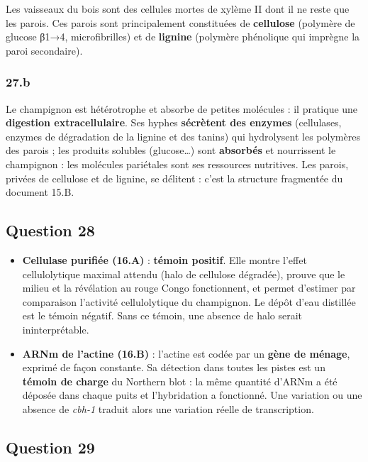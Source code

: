 \documentclass[11pt,a4paper]{article}
\providecommand{\tightlist}{\setlength{\itemsep}{0pt}\setlength{\parskip}{0pt}}
\begin{document}
Les vaisseaux du bois sont des cellules mortes de xylème II dont il ne reste que les parois. Ces parois sont principalement constituées de \textbf{cellulose} (polymère de glucose β1→4, microfibrilles) et de \textbf{lignine} (polymère phénolique qui imprègne la paroi secondaire).

\hypertarget{b}{%
\subsubsection{27.b}\label{b}}

Le champignon est hétérotrophe et absorbe de petites molécules : il pratique une \textbf{digestion extracellulaire}. Ses hyphes \textbf{sécrètent des enzymes} (cellulases, enzymes de dégradation de la lignine et des tanins) qui hydrolysent les polymères des parois ; les produits solubles (glucose\ldots) sont \textbf{absorbés} et nourrissent le champignon : les molécules pariétales sont ses ressources nutritives. Les parois, privées de cellulose et de lignine, se délitent : c'est la structure fragmentée du document 15.B.

\hypertarget{question-28}{%
\subsection{Question 28}\label{question-28}}

\begin{itemize}
\tightlist
\item
  \textbf{Cellulase purifiée (16.A)} : \textbf{témoin positif}. Elle montre l'effet cellulolytique maximal attendu (halo de cellulose dégradée), prouve que le milieu et la révélation au rouge Congo fonctionnent, et permet d'estimer par comparaison l'activité cellulolytique du champignon. Le dépôt d'eau distillée est le témoin négatif. Sans ce témoin, une absence de halo serait ininterprétable.
\item
  \textbf{ARNm de l'actine (16.B)} : l'actine est codée par un \textbf{gène de ménage}, exprimé de façon constante. Sa détection dans toutes les pistes est un \textbf{témoin de charge} du Northern blot : la même quantité d'ARNm a été déposée dans chaque puits et l'hybridation a fonctionné. Une variation ou une absence de \emph{cbh-1} traduit alors une variation réelle de transcription.
\end{itemize}

\hypertarget{question-29}{%
\subsection{Question 29}\label{question-29}}
\end{document}
